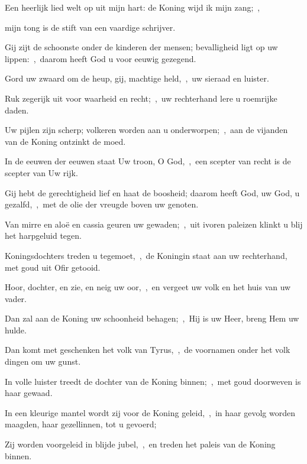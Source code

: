 \documentclass[12pt,twoside,a5paper]{article}
\begin{document}

\begin{halfparskip}
  Een heerlijk lied welt op uit mijn hart: de Koning wijd ik mijn zang;~\sep


  mijn tong is de stift van een vaardige schrijver.
\end{halfparskip}


\begin{halfparskip}
  Gij zijt de schoonste onder de kinderen der mensen; bevalligheid ligt op uw lippen:~\sep\ daarom heeft God u voor eeuwig gezegend.

  Gord uw zwaard om de heup, gij, machtige held,~\sep\ uw sieraad en luister.

  Ruk zegerijk uit voor waarheid en recht;~\sep\ uw rechterhand lere u roemrijke daden.

  Uw pijlen zijn scherp; volkeren worden aan u onderworpen;~\sep\ aan de vijanden van de Koning ontzinkt de moed.

  In de eeuwen der eeuwen staat Uw troon, O God,~\sep\ een scepter van recht is de scepter van Uw rijk.


  Gij hebt de gerechtigheid lief en haat de boosheid; daarom heeft God, uw God, u gezalfd,~\sep\ met de olie der vreugde boven uw genoten.

  Van mirre en aloë en cassia geuren uw gewaden;~\sep\ uit ivoren paleizen klinkt u blij het harpgeluid tegen.

  Koningsdochters treden u tegemoet,~\sep\ de Koningin staat aan uw rechterhand, met goud uit Ofir getooid.
\end{halfparskip}


\begin{halfparskip}
  Hoor, dochter, en zie, en neig uw oor,~\sep\ en vergeet uw volk en het huis van uw vader.

  Dan zal aan de Koning uw schoonheid behagen;~\sep\ Hij is uw Heer, breng Hem uw hulde.

  Dan komt met geschenken het volk van Tyrus,~\sep\ de voornamen onder het volk dingen om uw gunst.

  In volle luister treedt de dochter van de Koning binnen;~\sep\ met goud doorweven is haar gewaad.

  In een kleurige mantel wordt zij voor de Koning geleid,~\sep\ in haar gevolg worden maagden, haar gezellinnen, tot u gevoerd;

  Zij worden voorgeleid in blijde jubel,~\sep\ en treden het paleis van de Koning binnen.
\end{halfparskip}
\end{document}
